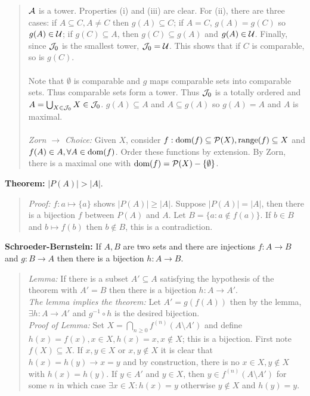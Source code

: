 \begin{quote}
${\cal A}$ is a tower.  Properties (i) and (iii) are clear.  For (ii), there are three cases:
if $A \subseteq C, A \neq C$ then $g(A) \subseteq C$;
if $A=C$, $g(A)=g(C)$ so $g(A) \in {\cal U}$;
if $g(C) \subseteq A$, then $g(C) \subseteq g(A)$ and $g(A) \in {\cal U}$.  Finally, since
${\cal J}_0$ is the smallest tower, ${\cal J}_0 = {\cal U}$.  This shows that if $C$ is comparable,
so is $g(C)$.
\\
\\
Note that $\emptyset$ is comparable and $g$ maps comparable sets into comparable sets.  Thus comparable
sets form a tower.  Thus ${\cal J}_0$ is a totally ordered and $A= \bigcup_{X \in {\cal J}_0} X \in {\cal J}_0$.
$g(A) \subseteq A$ and $A \subseteq g(A)$ so $g(A)=A$ and $A$ is maximal.
\\
\\
\emph{Zorn $\rightarrow$ Choice:}  Given $X$, consider $f: \textnormal{dom}(f) \subseteq {\cal P}(X),
\textnormal{range}(f) \subseteq X$ and $f(A) \in A, \forall A \in \textnormal{dom}(f)$.  Order these functions
by extension.  By Zorn, there is a maximal one with $\textnormal{dom}(f)= {\cal P}(X) - \{ \emptyset \}$.
\end{quote}
{\bf Theorem:}
$|P(A)| > |A|$. 
\begin{quote}
\emph{Proof:} $f: a \mapsto \{a\}$ shows
$|P(A)| \ge |A|$. Suppose
$|P(A)| = |A|$, then there is a bijection $f$ between
$P(A)$ and $A$.  Let $B= \{ a: a \notin f(a) \}$.  If $b \in B$ and $b \mapsto f(b)$
then $b \notin B$, this is a contradiction.
\end{quote}
{\bf Schroeder-Bernstein:}  If $A,B$ are two sets and there are injections 
$f: A \rightarrow B$ and
$g: B \rightarrow A$ then there is a bijection
$h: A \rightarrow B$.  
\begin{quote}
\emph{Lemma:} If there is a subset $A' \subseteq A$ satisfying the
hypothesis of the theorem with $A'=B$ then there is a bijection
$h: A \rightarrow A'$.  
\\
\emph{The lemma implies the theorem:} Let $A'=g(f(A))$ 
then by the lemma, $\exists h: A \rightarrow A'$ and $g^{-1} \circ h$ is the desired
bijection.  
\\
\emph{Proof of Lemma:}  Set $X= \bigcap_{n \ge 0} f^{(n)} (A \setminus A')$ and
define $h(x)= f(x), x \in X, h(x)=x, x \notin X$; this is a bijection.  
First note $f(X) \subseteq X$.  If $x,y \in X$ or $x,y \notin X$ it is clear that
$h(x)=h(y) \rightarrow x=y$ and by construction, there is no $x \in X, y \notin X$
with $h(x)=h(y)$.  If $y \in A'$ and $y \in X$, then $y \in f^{(n)}(A \setminus A')$
for some $n$ in which case $\exists x \in X: h(x)=y$ otherwise 
$y \notin X$ and $h(y)=y$.
\end{quote}
